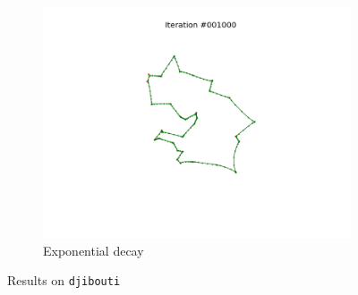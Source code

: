\documentclass[11pt]{article}
\begin{document}
\begin{figure}
\begin{subfigure}{.33\textwidth}
  \includegraphics[trim={6cm 2cm 6cm 2cm}, clip=true,width=\linewidth]{d_e.png}
  \caption{Exponential decay}
\end{subfigure}
\caption{Results on \texttt{djibouti}}
\label{fig:djibouti}
\end{figure}
\end{document}

